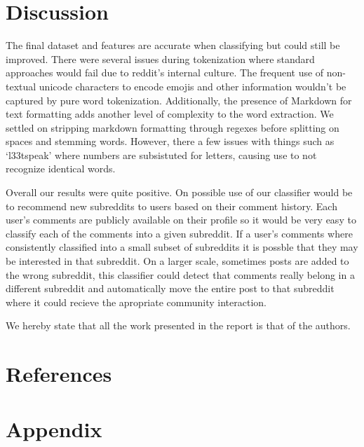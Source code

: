 \documentclass[10pt,twocolumn]{article}
\begin{document}
\section{Discussion}
The final dataset and features are accurate when classifying but could still be improved. There were several issues during tokenization where standard approaches would fail due to reddit's internal culture. The frequent use of non-textual unicode characters to encode emojis and other information wouldn't be captured by pure word tokenization. Additionally, the presence of Markdown for text formatting adds another level of complexity to the word extraction. We settled on stripping markdown formatting through regexes before splitting on spaces and stemming words. However, there a few issues with things such as `l33tspeak' where numbers are subsistuted for letters, causing use to not recognize identical words. 

Overall our results were quite positive. On possible use of our classifier would be to recommend new subreddits to users based on their comment history. Each user's comments are publicly available on their profile so it would be very easy to classify each of the comments into a given subreddit. If a user's comments where consistently classified into a small subset of subreddits it is possble that they may be interested in that subreddit. On a larger scale, sometimes posts are added to the wrong subreddit, this classifier could detect that comments really belong in a different subreddit and automatically move the entire post to that subreddit where it could recieve the apropriate community interaction.

We hereby state that all the work presented in the report is that of the authors.

\section{References}
\printbibliography
\section{Appendix}
\end{document}
